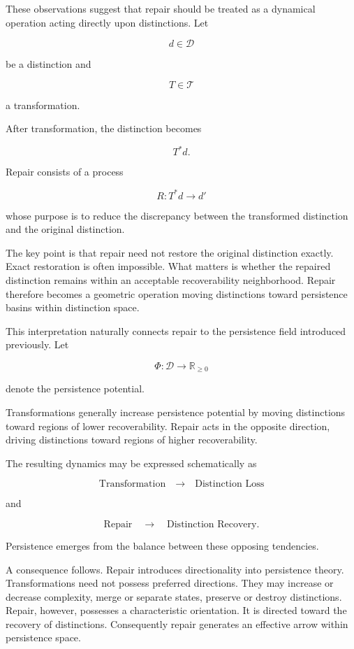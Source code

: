 \documentclass[12pt,oneside]{article}
\theoremstyle{definition}
\begin{document}
These observations suggest that repair should be treated as a dynamical operation acting directly upon distinctions. Let

\[
d\in\mathcal D
\]

be a distinction and

\[
T\in\mathcal T
\]

a transformation.

After transformation, the distinction becomes

\[
T^*d.
\]

Repair consists of a process

\[
R:T^*d \rightarrow d'
\]

whose purpose is to reduce the discrepancy between the transformed distinction and the original distinction.

The key point is that repair need not restore the original distinction exactly. Exact restoration is often impossible. What matters is whether the repaired distinction remains within an acceptable recoverability neighborhood. Repair therefore becomes a geometric operation moving distinctions toward persistence basins within distinction space.

This interpretation naturally connects repair to the persistence field introduced previously. Let

\[
\Phi:\mathcal D\rightarrow\mathbb R_{\ge0}
\]

denote the persistence potential.

Transformations generally increase persistence potential by moving distinctions toward regions of lower recoverability. Repair acts in the opposite direction, driving distinctions toward regions of higher recoverability.

The resulting dynamics may be expressed schematically as

\[
\text{Transformation}
\quad\longrightarrow\quad
\text{Distinction Loss}
\]

and

\[
\text{Repair}
\quad\longrightarrow\quad
\text{Distinction Recovery}.
\]

Persistence emerges from the balance between these opposing tendencies.

A consequence follows. Repair introduces directionality into persistence theory. Transformations need not possess preferred directions. They may increase or decrease complexity, merge or separate states, preserve or destroy distinctions. Repair, however, possesses a characteristic orientation. It is directed toward the recovery of distinctions. Consequently repair generates an effective arrow within persistence space.
\end{document}

